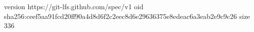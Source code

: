 version https://git-lfs.github.com/spec/v1
oid sha256:ceef5aa91fcd20ff90a4d8d6f2c2eec8d6e29636375e8edeac6a3eab2e9c9c26
size 336
